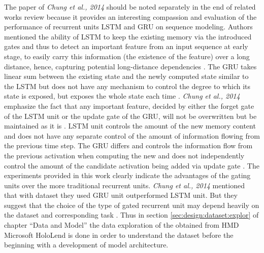 The paper of \textit{Chung et al., 2014} should be noted separately in the end of related works review because it provides an interesting compassion and evaluation of the performance of recurrent units LSTM and GRU on sequence modeling. Authors mentioned the ability of LSTM to keep the existing memory via the introduced gates and thus to detect an important feature from an input sequence at early stage, to easily carry this information (the existence of the feature) over a long distance, hence, capturing potential long-distance dependencies \cite{empirical_evaluation}. The GRU takes linear sum between the existing state and the newly computed state similar to the LSTM but does not have any mechanism to control the degree to which its state is exposed, but exposes the whole state each time \cite{empirical_evaluation}. \textit{Chung et al., 2014} emphasize the fact that any important feature, decided by either the forget gate of the LSTM unit or the update gate of the GRU, will not be overwritten but be maintained as it is \cite{empirical_evaluation}. LSTM unit controls the amount of the new memory content and does not have any separate control of the amount of information flowing from the previous time step. The GRU differs and controls the information flow from the previous activation when computing the new and does not independently control the amount of the candidate activation being added via update gate \cite{empirical_evaluation}. The experiments provided in this work clearly indicate the advantages of the gating units over the more traditional recurrent units. \textit{Chung et al., 2014} mentioned that with dataset they used GRU unit outperformed LSTM unit. But they suggest that the choice of the type of gated recurrent unit may depend heavily on the dataset and corresponding task \cite{empirical_evaluation}. Thus in section \ref{sec:design:dataset:explor} of chapter ``Data and Model'' the data exploration of the obtained from HMD Microsoft HoloLend is done in order to understand the dataset before the beginning with a development of model architecture. 